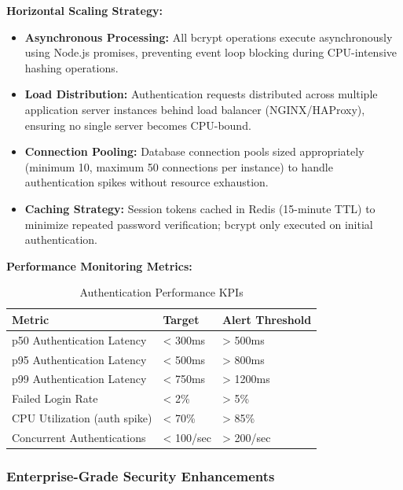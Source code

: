 \documentclass[12pt,a4paper]{article}
\begin{document}
\begin{tcolorbox}[colback=primaryblue!5, colframe=primaryblue, boxrule=1pt, arc=3pt, left=10pt, right=10pt, top=8pt, bottom=8pt]
\vspace{0.5em}

\textbf{Horizontal Scaling Strategy:}

\begin{itemize}[leftmargin=2em, itemsep=6pt]
    \item \textbf{Asynchronous Processing:} All bcrypt operations execute asynchronously using Node.js promises, preventing event loop blocking during CPU-intensive hashing operations.
    \item \textbf{Load Distribution:} Authentication requests distributed across multiple application server instances behind load balancer (NGINX/HAProxy), ensuring no single server becomes CPU-bound.
    \item \textbf{Connection Pooling:} Database connection pools sized appropriately (minimum 10, maximum 50 connections per instance) to handle authentication spikes without resource exhaustion.
    \item \textbf{Caching Strategy:} Session tokens cached in Redis (15-minute TTL) to minimize repeated password verification; bcrypt only executed on initial authentication.
\end{itemize}

\vspace{0.5em}

\textbf{Performance Monitoring Metrics:}

\begin{table}[H]
\centering
\begin{tabular}{|p{5cm}|p{4cm}|p{4cm}|}
\hline
\textbf{Metric} & \textbf{Target} & \textbf{Alert Threshold} \\
\hline
p50 Authentication Latency & < 300ms & > 500ms \\
\hline
p95 Authentication Latency & < 500ms & > 800ms \\
\hline
p99 Authentication Latency & < 750ms & > 1200ms \\
\hline
Failed Login Rate & < 2\% & > 5\% \\
\hline
CPU Utilization (auth spike) & < 70\% & > 85\% \\
\hline
Concurrent Authentications & < 100/sec & > 200/sec \\
\hline
\end{tabular}
\caption{Authentication Performance KPIs}
\end{table}

\subsubsection{Enterprise-Grade Security Enhancements}


\end{tcolorbox}
\end{document}
